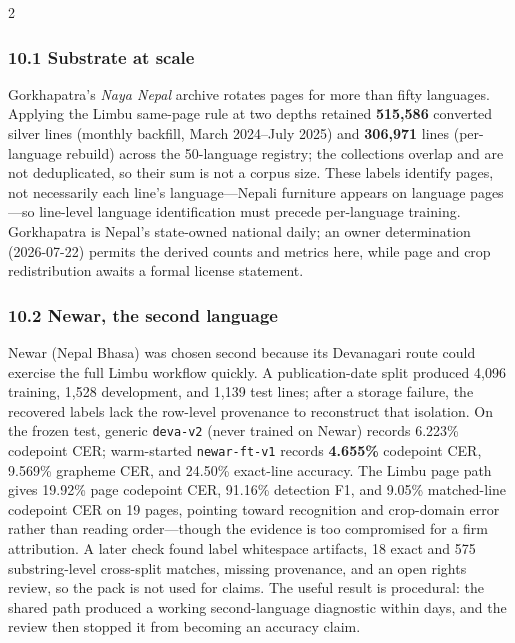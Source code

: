 \documentclass[
  10pt,
]{article}
\begin{document}
\begin{multicols}{2}

\subsubsection{10.1 Substrate at scale}\label{substrate-at-scale}

Gorkhapatra's \emph{Naya Nepal} archive rotates pages for more than
fifty languages. Applying the Limbu same-page rule at two depths
retained \textbf{515,586} converted silver lines (monthly backfill,
March 2024--July 2025) and \textbf{306,971} lines (per-language rebuild)
across the 50-language registry; the collections overlap and are not
deduplicated, so their sum is not a corpus size. These labels identify
pages, not necessarily each line's language---Nepali furniture appears
on language pages---so line-level language identification must precede
per-language training. Gorkhapatra is Nepal's state-owned national
daily; an owner determination (2026-07-22) permits the derived counts
and metrics here, while page and crop redistribution awaits a formal
license statement.

\subsubsection{10.2 Newar, the second
language}\label{newar-the-second-language}

Newar (Nepal Bhasa) was chosen second because its Devanagari route could
exercise the full Limbu workflow quickly. A publication-date split
produced 4,096 training, 1,528 development, and 1,139 test lines; after
a storage failure, the recovered labels lack the row-level provenance to
reconstruct that isolation. On the frozen test, generic \texttt{deva-v2}
(never trained on Newar) records 6.223\% codepoint CER; warm-started
\texttt{newar-ft-v1} records \textbf{4.655\%} codepoint CER, 9.569\%
grapheme CER, and 24.50\% exact-line accuracy. The Limbu page path gives
19.92\% page codepoint CER, 91.16\% detection F1, and 9.05\%
matched-line codepoint CER on 19 pages, pointing toward recognition and
crop-domain error rather than reading order---though the evidence is too
compromised for a firm attribution. A later check found label whitespace
artifacts, 18 exact and 575 substring-level cross-split matches, missing
provenance, and an open rights review, so the pack is not used for
claims. The useful result is procedural: the shared path produced a
working second-language diagnostic within days, and the review then
stopped it from becoming an accuracy claim.


\end{multicols}
\end{document}
